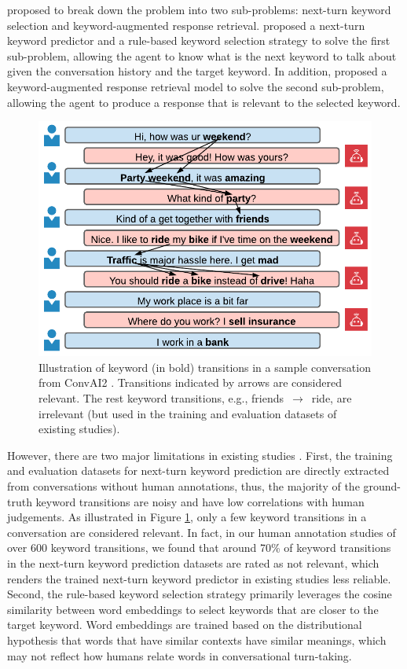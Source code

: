 \documentclass[letterpaper]{article} %
\begin{document}
\citet{tang2019target} proposed to break down the problem into two sub-problems: next-turn keyword selection and keyword-augmented response retrieval. \citet{tang2019target} proposed a next-turn keyword predictor and a rule-based keyword selection strategy to solve the first sub-problem, allowing the agent to know what is the next keyword to talk about given the conversation history and the target keyword. In addition, \citet{tang2019target} proposed a keyword-augmented response retrieval model to solve the second sub-problem, allowing the agent to produce a response that is relevant to the selected keyword.
\begin{figure}[!t]
\centering
\includegraphics[width=0.75\linewidth]{images/topic_transitions_v2.pdf}
\caption{Illustration of keyword (in bold) transitions in a sample conversation from ConvAI2 \cite{zhang2018personalizing}. Transitions indicated by arrows are considered relevant. The rest keyword transitions, e.g., friends $\,\to\,$ ride, are irrelevant (but used in the training and evaluation datasets of existing studies).}
\label{fig: topic transition}
\end{figure}

However, there are two major limitations in existing studies \cite{tang2019target, qin2020dynamic}. First, the training and evaluation datasets for next-turn keyword prediction are directly extracted from conversations without human annotations, thus, the majority of the ground-truth keyword transitions are noisy and have low correlations with human judgements. As illustrated in Figure \ref{fig: topic transition}, only a few keyword transitions in a conversation are considered relevant. In fact, in our human annotation studies of over 600 keyword transitions, we found that around 70\% of keyword transitions in the next-turn keyword prediction datasets are rated as not relevant, which renders the trained next-turn keyword predictor in existing studies less reliable.
Second, the rule-based keyword selection strategy primarily leverages the cosine similarity between word embeddings to select keywords that are closer to the target keyword. Word embeddings are trained based on the distributional hypothesis that words that have similar contexts have similar meanings, which may not reflect how humans relate words in conversational turn-taking.
\end{document}
